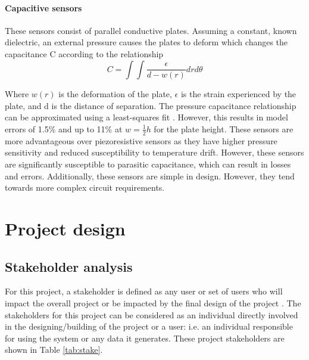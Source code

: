 \subsubsection{Capacitive sensors}

These sensors consist of parallel conductive plates. Assuming a constant, known dielectric, an external pressure causes the plates to deform which changes the capacitance C according to the relationship \cite{eaton1997micromachined}
\begin{equation}
	C = \int \int \frac{\epsilon}{d - w(r)}drd\theta
\end{equation}

Where $w(r)$ is the deformation of the plate, $\epsilon$ is the strain experienced by the plate, and d is the distance of separation. The pressure capacitance relationship can be approximated using a least-squares fit \cite{eaton1997micromachined}. However, this results in model errors of 1.5\% and up to 11\% at $w = \frac{1}{2}h$ for the plate height. These sensors are more advantageous over piezoresistive sensors as they have higher pressure sensitivity and reduced susceptibility to temperature drift. However, these sensors are significantly susceptible to parasitic capacitance, which can result in losses and errors. Additionally, these sensors are simple in design. However, they tend towards more complex circuit requirements.

\newpage
\chapter{Project design}

\section{Stakeholder analysis}
\label{app:stakeholder}
For this project, a stakeholder is defined as any user or set of users who will impact the overall project or be impacted by the final design of the project \cite{varvasovszky2000stakeholder}. The stakeholders for this project can be considered as an individual directly involved in the designing/building of the project or a user: i.e. an individual responsible for using the system or any data it generates.  These project stakeholders are shown in Table \ref{tab:stake}.

